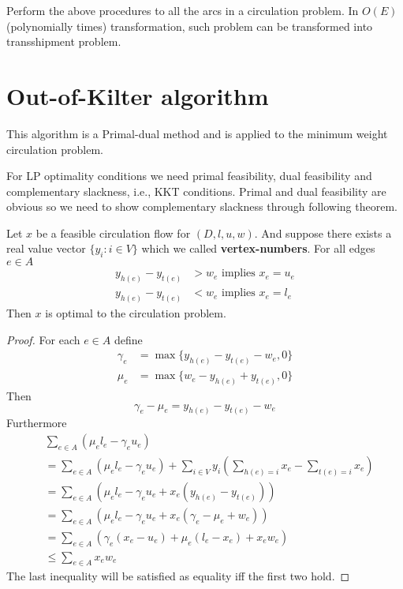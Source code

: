				Perform the above procedures to all the arcs in a circulation problem. In $O(E)$ (polynomially times) transformation, such problem can be transformed into transshipment problem.

			\section{Out-of-Kilter algorithm}
				This algorithm is a Primal-dual method and is applied to the minimum weight circulation problem.

				For LP optimality conditions we need primal feasibility, dual feasibility and complementary slackness, i.e., KKT conditions. Primal and dual feasibility are obvious so we need to show complementary slackness through following theorem.

				\begin{theorem}
					Let $x$ be a feasible circulation flow for $(D, l, u, w)$. And suppose there exists a real value vector $\{y_i: i \in V\}$ which we called \textbf{vertex-numbers}. For all edges $e\in A$
					\begin{align}
						y_{h(e)} - y_{t(e)} &> w_e \text{ implies } x_e = u_e\\
						y_{h(e)} - y_{t(e)} &< w_e \text{ implies } x_e = l_e
					\end{align}
					Then $x$ is optimal to the circulation problem.
				\end{theorem}

				\begin{proof}
					For each $e \in A$ define
					\begin{align}
						\gamma_e &= \max\{y_{h(e)} - y_{t(e)} - w_e, 0\} \\
						\mu_e &= \max\{w_e - y_{h(e)} + y_{t(e)}, 0\}
					\end{align}
					Then
					\begin{equation}
						\gamma_e - \mu_e = y_{h(e)} - y_{t(e)} - w_e
					\end{equation}
					Furthermore
					\begin{align}
						&\sum_{e\in A} (\mu_el_e - \gamma_eu_e) \\
						&= \sum_{e\in A} (\mu_el_e - \gamma_eu_e) + \sum_{i \in V}y_i(\sum_{h(e) = i} x_e - \sum_{t(e) = i} x_e)\\
						&= \sum_{e\in A} (\mu_el_e - \gamma_eu_e + x_e(y_{h(e)} - y_{t(e)}))\\
						&= \sum_{e\in A} (\mu_el_e - \gamma_eu_e + x_e(\gamma_e - \mu_e + w_e))\\
						&= \sum_{e\in A} (\gamma_e(x_e - u_e) + \mu_e(l_e - x_e) + x_ew_e)\\
						&\le \sum_{e\in A} x_ew_e 
					\end{align}
					The last inequality will be satisfied as equality iff the first two hold.
				\end{proof}

